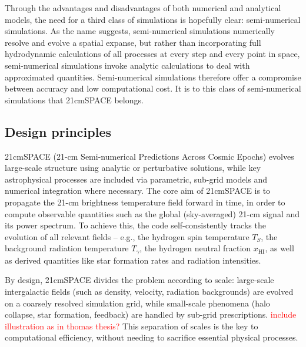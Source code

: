 \documentclass[floats,floatfix,showpacs,amssymb,prd,superscriptaddress,nofootinbib]{revtex4-2} %
\newcommand{\red}{\textcolor{red}}
\begin{document}
Through the advantages and disadvantages of both numerical and analytical models, the need for a third class of simulations is hopefully clear: semi-numerical simulations. As the name suggests, semi-numerical simulations numerically resolve and evolve a spatial expanse, but rather than incorporating full hydrodynamic calculations of all processes at every step and every point in space, semi-numerical simulations invoke analytic calculations to deal with approximated quantities. Semi-numerical simulations therefore offer a compromise between accuracy and low computational cost. It is to this class of semi-numerical simulations that 21cmSPACE belongs.


\subsection{Design principles}
21cmSPACE (21-cm Semi-numerical Predictions Across Cosmic Epochs) evolves large-scale structure using analytic or perturbative solutions, while key astrophysical processes are included via parametric, sub-grid models and numerical integration where necessary. The core aim of 21cmSPACE is to propagate the 21-cm brightness temperature field forward in time, in order to compute observable quantities such as the global (sky-averaged) 21-cm signal and its power spectrum. To achieve this, the code self-consistently tracks the evolution of all relevant fields -- e.g., the hydrogen spin temperature $T_S$, the background radiation temperature $T_\gamma$, the hydrogen neutral fraction $x_{\text{HI}}$, as well as derived quantities like star formation rates and radiation intensities.

By design, 21cmSPACE divides the problem according to scale: large-scale intergalactic fields (such as density, velocity, radiation backgrounds) are evolved on a coarsely resolved simulation grid, while small-scale phenomena (halo collapse, star formation, feedback) are handled by sub-grid prescriptions. \red{include illustration as in thomas thesis?} This separation of scales is the key to computational efficiency, without needing to sacrifice essential physical processes.
\end{document}

